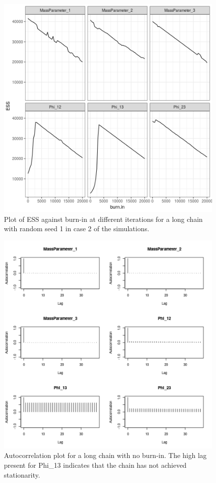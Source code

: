 \documentclass[12pt]{article} %
\begin{document}
	
	\begin{figure}[!htb]
		\centering
		\includegraphics[scale=0.65]{Images/Gen_data/Case_2/Esimated_burn_in_plot_1.png}
		\caption{Plot of ESS against burn-in at different iterations for a long chain with random seed 1 in case 2 of the simulations.}
		\label{fig:gen_data_case_2_estimated_burn_in_plot_1}
	\end{figure}
	
	\begin{figure}[!htb]
		\centering
		\includegraphics[scale=0.65]{Images/Gen_data/Case_2/Auto_correlation_plot_9.png}
		\caption{Autocorrelation plot for a long chain with no burn-in. The high lag present for Phi\_13 indicates that the chain has not achieved stationarity.}
		\label{fig:gen_data_case_2_bad_autocorrelation_plot_burn_20000_9}
	\end{figure}
	
\end{document}
